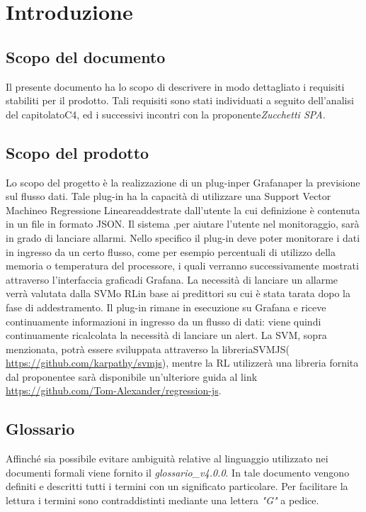 \section{Introduzione}
	\subsection{Scopo del documento}
		Il presente documento ha lo scopo di descrivere in modo dettagliato i requisiti stabiliti per il prodotto. Tali requisiti sono stati individuati a seguito dell'analisi del capitolato\glo C4, ed i successivi incontri con la proponente\glo \emph{Zucchetti SPA.}

	
\subsection{Scopo del prodotto}
   Lo scopo del progetto è la realizzazione di un plug-in\glo per Grafana\glo per la previsione sul flusso dati\glo. Tale plug-in ha la capacità di utilizzare una Support Vector Machine\glo o Regressione Lineare\glo addestrate dall'utente la cui definizione è contenuta in un file in formato JSON\glo. Il sistema ,per aiutare l’utente nel monitoraggio, sarà in grado di lanciare allarmi.
Nello specifico il plug-in deve poter monitorare i dati in ingresso da un certo flusso, come per esempio percentuali di utilizzo della memoria o temperatura del processore, i quali verranno successivamente mostrati attraverso l'interfaccia grafica\glo di Grafana.
La necessità di lanciare un allarme verrà valutata dalla SVM\glo o RL\glo in base ai predittori su cui è stata tarata dopo la fase di addestramento.
Il plug-in rimane in esecuzione su Grafana e riceve continuamente informazioni in ingresso da un flusso di dati: viene quindi continuamente ricalcolata la necessità di lanciare un alert\glo.
La SVM, sopra menzionata, potrà essere sviluppata attraverso la libreria\glo SVMJS\glo (\url{ https://github.com/karpathy/svmjs}), mentre la RL utilizzerà una libreria fornita dal proponente\glo e sarà disponibile un’ulteriore guida al link \url{https://github.com/Tom-Alexander/regression-js}.

	
	\subsection{Glossario}
		Affinché sia possibile evitare ambiguità relative al linguaggio utilizzato nei documenti formali viene fornito il \emph{glossario\_v4.0.0}. In tale documento vengono definiti e descritti tutti i termini con un significato particolare. Per facilitare la lettura i termini sono contraddistinti mediante una lettera \emph{"G"} a pedice.
		
